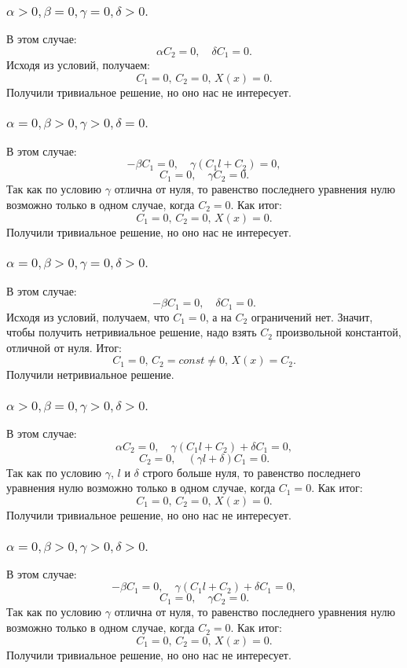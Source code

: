 \documentclass[12pt, a4paper]{article}
\begin{document}
\subsubsection{ $ \alpha > 0, \beta = 0, \gamma = 0, \delta > 0. $}
В этом случае:
\[\alpha C_{2} = 0, \quad \delta C_{1} = 0. \]
Исходя из условий, получаем:
\[ C_{1} = 0, \, C_{2} = 0, \, X(x) = 0. \]
Получили тривиальное решение, но оно нас не интересует.

\subsubsection{ $ \alpha = 0, \beta > 0, \gamma > 0, \delta = 0. $}
В этом случае:
\[ - \beta C_{1} = 0, \quad \gamma (C_{1} l + C_{2}) = 0, \]
\[ C_{1} = 0, \quad \gamma C_{2} = 0. \]
Так как по условию $\gamma$ отлична от нуля, то равенство последнего уравнения нулю возможно только в одном случае, когда $C_{2} = 0$. Как итог:
\[ C_{1} = 0, \, C_{2} = 0, \, X(x) = 0. \]
Получили тривиальное решение, но оно нас не интересует.

\subsubsection{ $ \alpha = 0, \beta > 0, \gamma = 0, \delta > 0. $}
В этом случае:
\[-\beta C_{1} = 0, \quad \delta C_{1} = 0. \]
Исходя из условий, получаем, что $C_{1} = 0$, а на $C_{2}$ ограничений нет. Значит, чтобы получить нетривиальное решение, надо взять $C_{2}$ произвольной константой, отличной от нуля. Итог:
\[ C_{1} = 0, \, C_{2} = const \neq 0, \, X(x) = C_{2}. \]
Получили нетривиальное решение.

\subsubsection{ $ \alpha > 0, \beta = 0, \gamma > 0, \delta > 0. $}
В этом случае:
\[ \alpha C_{2} = 0, \quad \gamma (C_{1} l + C_{2}) + \delta C_{1} = 0, \]
\[ C_{2} = 0, \quad (\gamma l + \delta) C_{1} = 0. \]
Так как по условию $\gamma$, $l$ и $\delta$ строго больше нуля, то равенство последнего уравнения нулю возможно только в одном случае, когда $C_{1} = 0$. Как итог:
\[ C_{1} = 0, \, C_{2} = 0, \, X(x) = 0. \]
Получили тривиальное решение, но оно нас не интересует.

\subsubsection{ $ \alpha = 0, \beta > 0, \gamma > 0, \delta > 0. $}
В этом случае:
\[ - \beta C_{1} = 0, \quad \gamma (C_{1} l + C_{2}) + \delta C_{1} = 0, \]
\[ C_{1} = 0, \quad \gamma C_{2} = 0. \]
Так как по условию $\gamma$ отлична от нуля, то равенство последнего уравнения нулю возможно только в одном случае, когда $C_{2} = 0$. Как итог:
\[ C_{1} = 0, \, C_{2} = 0, \, X(x) = 0. \]
Получили тривиальное решение, но оно нас не интересует.
\end{document}
